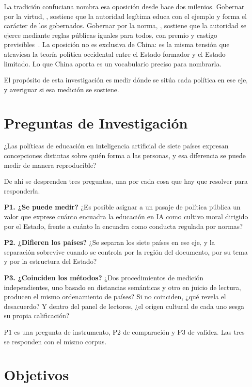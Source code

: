 La tradición confuciana nombra esa oposición desde hace dos milenios. Gobernar por la virtud, \dezhi{}, sostiene que la autoridad legítima educa con el ejemplo y forma el carácter de los gobernados. Gobernar por la norma, \fa{}, sostiene que la autoridad se ejerce mediante reglas públicas iguales para todos, con premio y castigo previsibles~\citep{pines2023legalism}. La oposición no es exclusiva de China: es la misma tensión que atraviesa la teoría política occidental entre el Estado formador y el Estado limitado. Lo que China aporta es un vocabulario preciso para nombrarla.

El propósito de esta investigación es medir dónde se sitúa cada política en ese eje, y averiguar si esa medición se sostiene.


\section{Preguntas de Investigación}

\begin{researchquestion}
¿Las políticas de educación en inteligencia artificial de siete países expresan concepciones distintas sobre quién forma a las personas, y esa diferencia se puede medir de manera reproducible?
\end{researchquestion}

De ahí se desprenden tres preguntas, una por cada cosa que hay que resolver para responderla.

\textbf{P1. ¿Se puede medir?} ¿Es posible asignar a un pasaje de política pública un valor que exprese cuánto encuadra la educación en IA como cultivo moral dirigido por el Estado, frente a cuánto la encuadra como conducta regulada por normas?

\textbf{P2. ¿Difieren los países?} ¿Se separan los siete países en ese eje, y la separación sobrevive cuando se controla por la región del documento, por su tema y por la estructura del Estado?

\textbf{P3. ¿Coinciden los métodos?} ¿Dos procedimientos de medición independientes, uno basado en distancias semánticas y otro en juicio de lectura, producen el mismo ordenamiento de países? Si no coinciden, ¿qué revela el desacuerdo? Y dentro del panel de lectores, ¿el origen cultural de cada uno sesga su propia calificación?

P1 es una pregunta de instrumento, P2 de comparación y P3 de validez. Las tres se responden con el mismo corpus.


\section{Objetivos}

